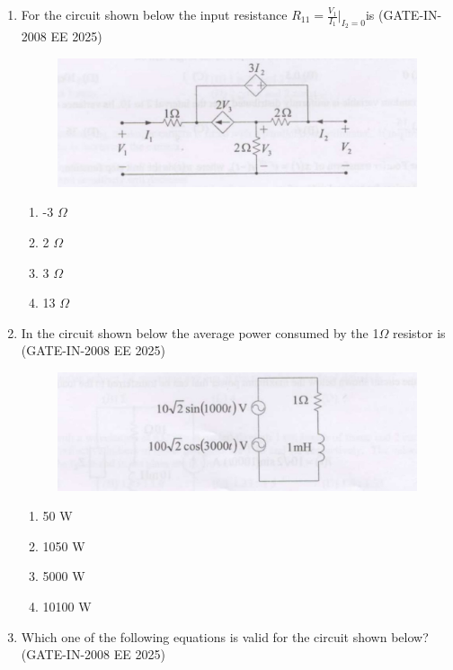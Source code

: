 \documentclass[journal,12pt,onecolumn]{IEEEtran}
\theoremstyle{remark}
\begin{document}
\begin{enumerate}[label=Q.\arabic*,start=1]
    \item For the circuit shown below the input resistance $R_{11} = \frac{V_{1}}{I_{1}}\Big|_{I_{2}=0}$is (GATE-IN-2008 EE 2025)
  \begin{figure}[H]
    \centering
    \includegraphics[width=0.5\linewidth]{figs/i12.jpg}
    \label{fig:placeholder12}
\end{figure}
    \begin{enumerate} 
        \item -3 $\Omega$
        \item  2 $\Omega$
        \item  3 $\Omega$
        \item 13 $\Omega$
    \end{enumerate}
    
    \item In the circuit shown below the average power consumed by the 1$\Omega$ resistor is (GATE-IN-2008 EE 2025)

  \begin{figure}[H]
    \centering
    \includegraphics[width=0.5\linewidth]{figs/i13.jpg}
    \label{fig:placeholder13}
\end{figure}

    \begin{enumerate} 
        \item 50 W
        \item 1050 W
        \item 5000 W
        \item 10100 W
    \end{enumerate}
    
    \item Which one of the following equations is valid for the circuit shown below? (GATE-IN-2008 EE 2025)


\end{enumerate}
\end{document}
